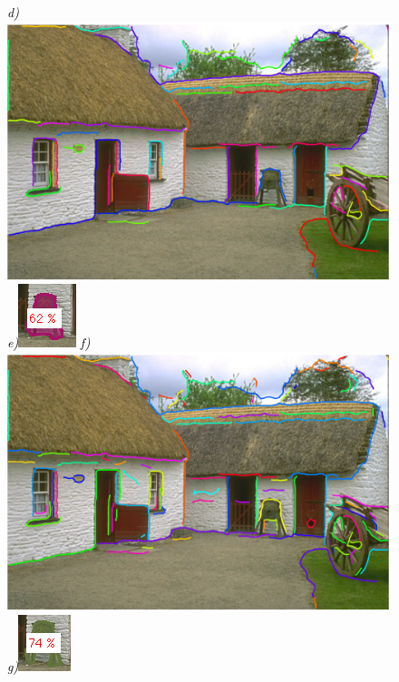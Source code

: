 \begin{figure}[!ht]
{\footnotesize\textit{\textcolor{black}{d)}}}\includegraphics[width=0.22\linewidth]{figs/obj_cons_bad.pdf}
{\footnotesize\textit{\textcolor{black}{e)}}}\includegraphics[width=0.22\linewidth]{figs/bad_fig.png}
{\footnotesize\textit{\textcolor{black}{f)}}}\includegraphics[width=0.22\linewidth]{figs/obj_cons_good.pdf}
{\footnotesize\textit{\textcolor{black}{g)}}}\includegraphics[width=0.22\linewidth]{figs/good_examp.png}





\end{figure}
